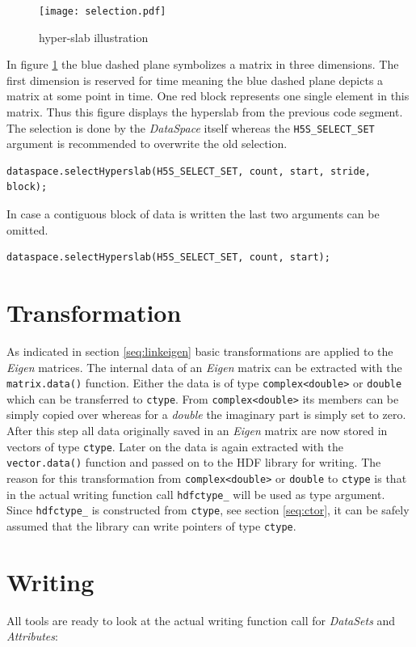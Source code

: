 \begin{figure}[ht!]
\centering
\texttt{[image: selection.pdf]}
\caption{hyper-slab illustration}
\label{fig:hyperslab}
\end{figure}
In figure \ref{fig:hyperslab} the blue dashed plane symbolizes a matrix in three dimensions. The first dimension is reserved for time meaning the blue dashed plane depicts a matrix at some point in time. One red block represents one single element in this matrix. Thus this figure displays the hyperslab from the previous code segment. The selection is done by the \textit{DataSpace} itself whereas the \texttt{H5S\_SELECT\_SET} argument is recommended to overwrite the old selection.
\begin{lstlisting}
dataspace.selectHyperslab(H5S_SELECT_SET, count, start, stride, block);
\end{lstlisting}
In case a contiguous block of data is written the last two arguments can be omitted.
\begin{lstlisting}
dataspace.selectHyperslab(H5S_SELECT_SET, count, start);
\end{lstlisting}


\section{Transformation}
\label{seq:transform}
As indicated in section \ref{seq:linkeigen} basic transformations are applied to the \textit{Eigen} matrices. The internal data of an \textit{Eigen} matrix can be extracted with the \texttt{matrix.data()} function. Either the data is of type \texttt{complex<double>} or \texttt{double} which can be transferred to \texttt{ctype}. From \texttt{complex<double>} its members can be simply copied over whereas for a \textit{double} the imaginary part is simply set to zero. After this step all data originally saved in an \textit{Eigen} matrix are now stored in vectors of type \texttt{ctype}. Later on the data is again extracted with the \texttt{vector.data()} function and passed on to the HDF library for writing. The reason for this transformation from \texttt{complex<double>} or \texttt{double} to \texttt{ctype} is that in the actual writing function call \texttt{hdfctype\_} will be used as type argument. Since \texttt{hdfctype\_} is constructed from \texttt{ctype}, see section \ref{seq:ctor}, it can be safely assumed that the library can write pointers of type \texttt{ctype}.

\section{Writing}
\label{seq:writing}
All tools are ready to look at the actual writing function call for \textit{DataSets} and \textit{Attributes}:
 
